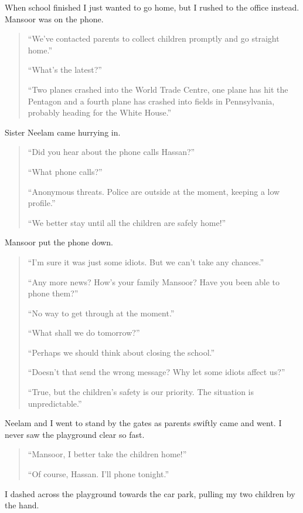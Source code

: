 \documentclass[12pt]{memoir}
\begin{document}
When school finished I just wanted to go home,
but I rushed to the office instead.
Mansoor was on the phone.

\begin{quote}
“We’ve contacted parents to collect children promptly and go straight home.”

“What’s the latest?”

“Two planes crashed into the World Trade Centre,
one plane has hit the Pentagon and a fourth plane has crashed
into fields in Pennsylvania, probably heading for the White House.”
\end{quote}

Sister Neelam came hurrying in.

\begin{quote}
“Did you hear about the phone calls\cor{}{,} Hassan?”

“What phone calls?”

“Anonymous threats.
Police are outside at the moment, keeping a low profile.”

“We better stay until all the children are safely home!”
\end{quote}

Mansoor put the phone down.

\begin{quote}
“I’m sure it was just some idiots.
But we can’t take any chances.”

“Any more news? How’s your family Mansoor? Have you been able to phone them?”

“No way to get through at the moment.”

“What shall we do tomorrow?”

“Perhaps we should think about closing the school.”

“Doesn’t that send the wrong message? Why let some idiots affect us?”

“True, but the children’s safety is our priority.
The situation is unpredictable.”
\end{quote}

Neelam and I went to stand by the gates as parents swiftly came and went.
I never saw the playground clear so fast.

\begin{quote}
“Mansoor, I better take the children home!”

“Of course, Hassan.
I’ll phone tonight.”
\end{quote}

I dashed across the playground towards the car park,
pulling my two children by the hand.
\end{document}
